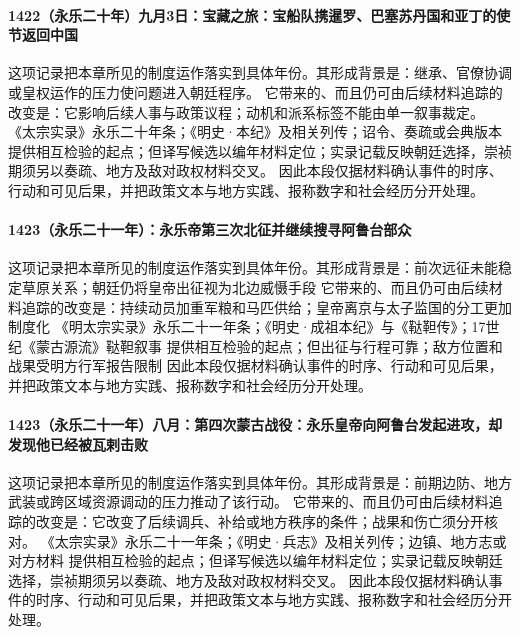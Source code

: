 \paragraph{1422（永乐二十年）九月3日：宝藏之旅：宝船队携暹罗、巴塞苏丹国和亚丁的使节返回中国} 这项记录把本章所见的制度运作落实到具体年份。其形成背景是：继承、官僚协调或皇权运作的压力使问题进入朝廷程序。 它带来的、而且仍可由后续材料追踪的改变是：它影响后续人事与政策议程；动机和派系标签不能由单一叙事裁定。 《太宗实录》永乐二十年条；《明史·本纪》及相关列传；诏令、奏疏或会典版本 提供相互检验的起点；但译写候选以编年材料定位；实录记载反映朝廷选择，崇祯期须另以奏疏、地方及敌对政权材料交叉。 因此本段仅据材料确认事件的时序、行动和可见后果，并把政策文本与地方实践、报称数字和社会经历分开处理。

\paragraph{1423（永乐二十一年）：永乐帝第三次北征并继续搜寻阿鲁台部众} 这项记录把本章所见的制度运作落实到具体年份。其形成背景是：前次远征未能稳定草原关系；朝廷仍将皇帝出征视为北边威慑手段 它带来的、而且仍可由后续材料追踪的改变是：持续动员加重军粮和马匹供给；皇帝离京与太子监国的分工更加制度化 《明太宗实录》永乐二十一年条；《明史·成祖本纪》与《鞑靼传》；17世纪《蒙古源流》鞑靼叙事 提供相互检验的起点；但出征与行程可靠；敌方位置和战果受明方行军报告限制 因此本段仅据材料确认事件的时序、行动和可见后果，并把政策文本与地方实践、报称数字和社会经历分开处理。

\paragraph{1423（永乐二十一年）八月：第四次蒙古战役：永乐皇帝向阿鲁台发起进攻，却发现他已经被瓦剌击败} 这项记录把本章所见的制度运作落实到具体年份。其形成背景是：前期边防、地方武装或跨区域资源调动的压力推动了该行动。 它带来的、而且仍可由后续材料追踪的改变是：它改变了后续调兵、补给或地方秩序的条件；战果和伤亡须分开核对。 《太宗实录》永乐二十一年条；《明史·兵志》及相关列传；边镇、地方志或对方材料 提供相互检验的起点；但译写候选以编年材料定位；实录记载反映朝廷选择，崇祯期须另以奏疏、地方及敌对政权材料交叉。 因此本段仅据材料确认事件的时序、行动和可见后果，并把政策文本与地方实践、报称数字和社会经历分开处理。

